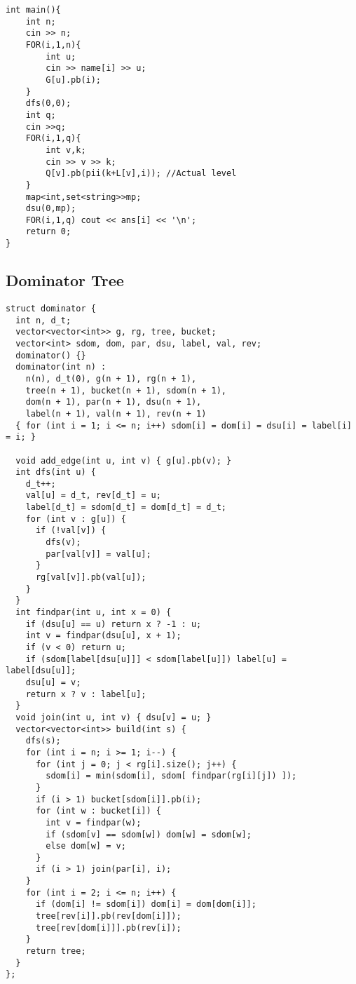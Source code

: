 \documentclass[10pt,a4paper,onesided]{article}
\begin{document}
\begin{multicols*}{3}
\begin{lstlisting}
int main(){
    int n;
    cin >> n;
    FOR(i,1,n){
        int u;
        cin >> name[i] >> u;
        G[u].pb(i);
    }
    dfs(0,0);
    int q;
    cin >>q;
    FOR(i,1,q){
        int v,k;
        cin >> v >> k;
        Q[v].pb(pii(k+L[v],i)); //Actual level
    }
    map<int,set<string>>mp;
    dsu(0,mp);
    FOR(i,1,q) cout << ans[i] << '\n';
    return 0;
}
\end{lstlisting}
\subsection{Dominator Tree}
\begin{lstlisting}
struct dominator {
  int n, d_t;
  vector<vector<int>> g, rg, tree, bucket;
  vector<int> sdom, dom, par, dsu, label, val, rev;
  dominator() {}
  dominator(int n) : 
    n(n), d_t(0), g(n + 1), rg(n + 1),
    tree(n + 1), bucket(n + 1), sdom(n + 1),
    dom(n + 1), par(n + 1), dsu(n + 1),
    label(n + 1), val(n + 1), rev(n + 1)
  { for (int i = 1; i <= n; i++) sdom[i] = dom[i] = dsu[i] = label[i] = i; }

  void add_edge(int u, int v) { g[u].pb(v); }
  int dfs(int u) {
    d_t++;
    val[u] = d_t, rev[d_t] = u;
    label[d_t] = sdom[d_t] = dom[d_t] = d_t;
    for (int v : g[u]) {
      if (!val[v]) {
        dfs(v);
        par[val[v]] = val[u];
      }
      rg[val[v]].pb(val[u]);
    }
  }
  int findpar(int u, int x = 0) {
    if (dsu[u] == u) return x ? -1 : u;
    int v = findpar(dsu[u], x + 1);
    if (v < 0) return u;
    if (sdom[label[dsu[u]]] < sdom[label[u]]) label[u] = label[dsu[u]];
    dsu[u] = v;
    return x ? v : label[u];
  }
  void join(int u, int v) { dsu[v] = u; }
  vector<vector<int>> build(int s) {
    dfs(s);
    for (int i = n; i >= 1; i--) {
      for (int j = 0; j < rg[i].size(); j++) {
        sdom[i] = min(sdom[i], sdom[ findpar(rg[i][j]) ]);
      }
      if (i > 1) bucket[sdom[i]].pb(i);
      for (int w : bucket[i]) {
        int v = findpar(w);
        if (sdom[v] == sdom[w]) dom[w] = sdom[w];
        else dom[w] = v;
      }
      if (i > 1) join(par[i], i);
    }
    for (int i = 2; i <= n; i++) {
      if (dom[i] != sdom[i]) dom[i] = dom[dom[i]];
      tree[rev[i]].pb(rev[dom[i]]);
      tree[rev[dom[i]]].pb(rev[i]);
    }
    return tree;
  }
};
\end{lstlisting}

\end{multicols*}
\end{document}
